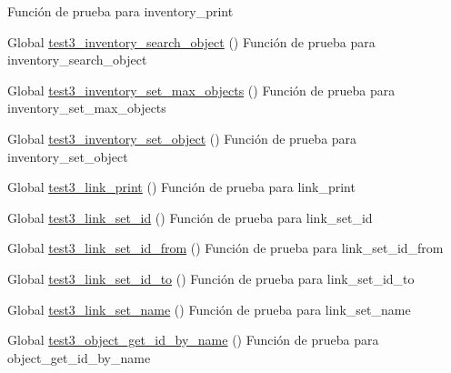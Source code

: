 \begin{DoxyRefList}
%
Función de prueba para inventory\+\_\+print  
\item[Global \mbox{\hyperlink{inventory__test_8c_a1ef29f251219dba3188917159cf5b73c}{test3\+\_\+inventory\+\_\+search\+\_\+object}} ()]\label{test__test000069}%
%
Función de prueba para inventory\+\_\+search\+\_\+object  
\item[Global \mbox{\hyperlink{inventory__test_8c_a270c2d6aecda0d73fbcff6ca0c9a90db}{test3\+\_\+inventory\+\_\+set\+\_\+max\+\_\+objects}} ()]\label{test__test000074}%
%
Función de prueba para inventory\+\_\+set\+\_\+max\+\_\+objects  
\item[Global \mbox{\hyperlink{inventory__test_8c_afeec9d3504d3663c7fb8884e1bb1562d}{test3\+\_\+inventory\+\_\+set\+\_\+object}} ()]\label{test__test000046}%
%
Función de prueba para inventory\+\_\+set\+\_\+object  
\item[Global \mbox{\hyperlink{link__test_8c_a3142c89c0e0ddb961b03ed04d94b8995}{test3\+\_\+link\+\_\+print}} ()]\label{test__test000105}%
%
Función de prueba para link\+\_\+print  
\item[Global \mbox{\hyperlink{link__test_8c_ac4d98b2913728aeb1fe6735ac96bb25a}{test3\+\_\+link\+\_\+set\+\_\+id}} ()]\label{test__test000083}%
%
Función de prueba para link\+\_\+set\+\_\+id  
\item[Global \mbox{\hyperlink{link__test_8c_a009c187bec3c13f4605e88b202ef0dae}{test3\+\_\+link\+\_\+set\+\_\+id\+\_\+from}} ()]\label{test__test000093}%
%
Función de prueba para link\+\_\+set\+\_\+id\+\_\+from  
\item[Global \mbox{\hyperlink{link__test_8c_a794995376a971d30e0fed03287ca372f}{test3\+\_\+link\+\_\+set\+\_\+id\+\_\+to}} ()]\label{test__test000098}%
%
Función de prueba para link\+\_\+set\+\_\+id\+\_\+to  
\item[Global \mbox{\hyperlink{link__test_8c_a8396e33f601deb52c940cb89cd7c6bfe}{test3\+\_\+link\+\_\+set\+\_\+name}} ()]\label{test__test000088}%
%
Función de prueba para link\+\_\+set\+\_\+name  
\item[Global \mbox{\hyperlink{object__test_8c_a13ab730f1fd81af84d2068341fad5d2d}{test3\+\_\+object\+\_\+get\+\_\+id\+\_\+by\+\_\+name}} ()]\label{test__test000126}%
%
Función de prueba para object\+\_\+get\+\_\+id\+\_\+by\+\_\+name  

\end{DoxyRefList}
